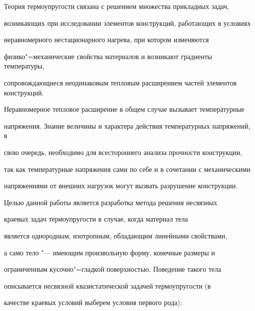 Теория термоупругости связана с решением множества прикладных задач,

возникающих при исследовании элементов конструкций, работающих в условиях

неравномерного нестационарного нагрева, при котором изменяются

физико"=механические свойства материалов и возникают градиенты температуры,

сопровождающиеся не\-оди\-наковым тепловым расширением частей элементов конструкций.

Неравномерное тепловое расширение в общем случае вызывает температурные

напряжения. Знание величины и характера действия температурных напряжений, в

свою очередь, необходимо для всестороннего анализа прочности конструкции,

так как температурные напряжения сами по себе и в сочетании с механическими

напряжениями от внешних нагрузок могут вызвать разрушение конструкции.



Целью данной работы является разработка метода решения несвязных

краевых задач термоупругости в случае, когда материал тела

является однородным, изотропным, обладающим линейными свойствами,

а само тело "--- имеющим произвольную форму, конечные размеры и

ограниченным кусочно"=гладкой поверхностью. Поведение такого тела

описывается несвязной квазистатической задачей термоупругости (в

качестве краевых условий выберем условия первого рода):

